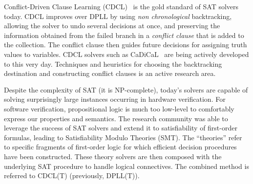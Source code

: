 Conflict-Driven Clause Learning (CDCL)~\cite{CDCL} is the gold standard of SAT solvers today.
CDCL improves over DPLL by using \emph{non chronological} backtracking, allowing the solver to undo several decisions at once, and preserving the information obtained from the failed branch in a \emph{conflict clause} that is added to the collection.
The conflict clause then guides future decisions for assigning truth values to variables.
CDCL solvers such as CaDiCaL~\cite{SAT2020:CaDiCaL} are being actively developed to this very day.
Techniques and heuristics for choosing the backtracking destination and constructing conflict clauses is an active research area.

Despite the complexity of SAT (it is NP-complete), today's solvers are capable of solving surprisingly large instances occurring in hardware verification.
For software verification, propositional logic is much too low-level to comfortably express our properties and semantics.
The research community was able to leverage the success of SAT solvers and extend it to satisfiability of first-order formulas, leading to Satisfiability Modulo Theories (SMT).
The ``theories'' refer to specific fragments of first-order logic for which efficient decision procedures have been constructed.
These theory solvers are then composed with the underlying SAT procedure to handle logical connectives.
The combined method is referred to CDCL(T) (previously, DPLL(T)).
